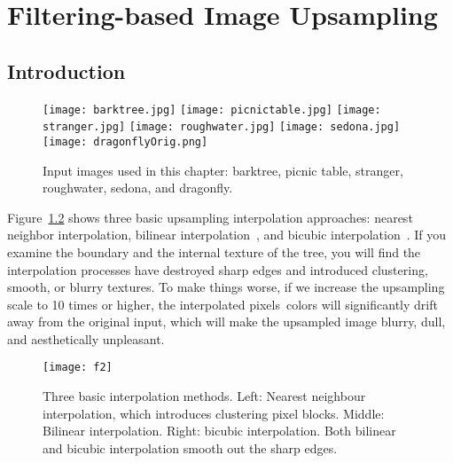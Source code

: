 \chapter{Filtering-based Image Upsampling}\label {chap:filter}
\section{Introduction}\label{sectionIntroduction}

\begin{figure}[htbp]\centering

\texttt{[image: barktree.jpg]}
\texttt{[image: picnictable.jpg]}
\texttt{[image: stranger.jpg]}
\texttt{[image: roughwater.jpg]}
\texttt{[image: sedona.jpg]}
\texttt{[image: dragonflyOrig.png]}
\caption{Input images used in this chapter: barktree, picnic table, stranger, roughwater, sedona, and dragonfly.}
\label{fig:origImages}
\end{figure}

Figure~\ref{fig:normalInterpolation} shows three basic upsampling interpolation approaches: nearest neighbor interpolation, bilinear interpolation~\cite{Unser:spline}, and bicubic interpolation~\cite{bicubic}. If you examine the boundary and the internal texture of the tree, you will find the interpolation processes have destroyed sharp edges and introduced clustering, smooth, or blurry textures. To make things worse, if we increase the upsampling scale to 10 times or higher, the interpolated pixels\textquotesingle ~colors will significantly drift away from the original input, which will make the upsampled image blurry, dull, and aesthetically unpleasant.

\begin{figure}[htbp] \centering
\texttt{[image: f2]}
\caption{Three basic interpolation methods. Left: Nearest neighbour interpolation, which introduces clustering pixel blocks. Middle: Bilinear interpolation. Right: bicubic interpolation. Both bilinear and bicubic interpolation smooth out the sharp edges.}
\label{fig:normalInterpolation}
\end{figure}

